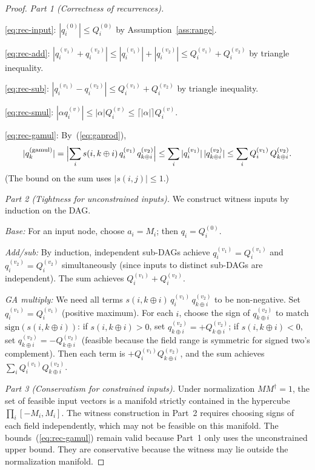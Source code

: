 \documentclass[11pt,a4paper]{article}
\theoremstyle{definition}
\theoremstyle{plain}
\theoremstyle{remark}
\begin{document}
\begin{proof}
\textit{Part 1 (Correctness of recurrences).}

\eqref{eq:rec-input}: $|q_i^{(0)}| \le Q_i^{(0)}$ by Assumption~\ref{ass:range}.

\eqref{eq:rec-add}: $|q_i^{(v_1)} + q_i^{(v_2)}| \le |q_i^{(v_1)}| + |q_i^{(v_2)}|
  \le Q_i^{(v_1)} + Q_i^{(v_2)}$ by triangle inequality.

\eqref{eq:rec-sub}: $|q_i^{(v_1)} - q_i^{(v_2)}| \le Q_i^{(v_1)} + Q_i^{(v_2)}$
  by triangle inequality.

\eqref{eq:rec-smul}: $|\alpha q_i^{(v)}| \le |\alpha| Q_i^{(v)} \le
  \lceil|\alpha|\rceil Q_i^{(v)}$.

\eqref{eq:rec-gamul}: By~(\ref{eq:gaprod}),
\[
  |q_k^{(\mathrm{gamul})}|
  = \Bigl|\sum_i s(i,k\oplus i)\,q_i^{(v_1)}\,q_{k\oplus i}^{(v_2)}\Bigr|
  \le \sum_i |q_i^{(v_1)}|\,|q_{k\oplus i}^{(v_2)}|
  \le \sum_i Q_i^{(v_1)}\,Q_{k\oplus i}^{(v_2)}.
\]
(The bound on the sum uses $|s(i,j)| \le 1$.)

\textit{Part 2 (Tightness for unconstrained inputs).}
We construct witness inputs by induction on the DAG.

\emph{Base:} For an input node, choose $a_i = M_i$;
then $q_i = Q_i^{(0)}$.

\emph{Add/sub:} By induction, independent sub-DAGs achieve
$q_i^{(v_1)} = Q_i^{(v_1)}$ and $q_i^{(v_2)} = Q_i^{(v_2)}$
simultaneously (since inputs to distinct sub-DAGs are independent).
The sum achieves $Q_i^{(v_1)} + Q_i^{(v_2)}$.

\emph{GA multiply:}
We need all terms $s(i,k\oplus i)\,q_i^{(v_1)}\,q_{k\oplus i}^{(v_2)}$
to be non-negative.
Set $q_i^{(v_1)} = Q_i^{(v_1)}$ (positive maximum).
For each $i$, choose the sign of $q_{k\oplus i}^{(v_2)}$ to match
$\mathrm{sign}(s(i,k\oplus i))$:
if $s(i,k\oplus i) > 0$, set $q_{k\oplus i}^{(v_2)} = +Q_{k\oplus i}^{(v_2)}$;
if $s(i,k\oplus i) < 0$, set $q_{k\oplus i}^{(v_2)} = -Q_{k\oplus i}^{(v_2)}$
(feasible because the field range is symmetric for signed two's complement).
Then each term is $+Q_i^{(v_1)} Q_{k\oplus i}^{(v_2)}$, and the sum
achieves $\sum_i Q_i^{(v_1)} Q_{k\oplus i}^{(v_2)}$.

\textit{Part 3 (Conservatism for constrained inputs).}
Under normalization $MM^\dagger = 1$, the set of feasible input
vectors is a manifold strictly contained in the hypercube
$\prod_i [-M_i, M_i]$.
The witness construction in Part~2 requires choosing signs of each
field independently, which may not be feasible on this manifold.
The bounds~(\ref{eq:rec-gamul}) remain valid because Part~1 only
uses the unconstrained upper bound.
They are conservative because the witness may lie outside the
normalization manifold.
\end{proof}
\end{document}
